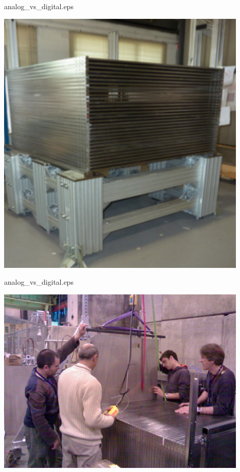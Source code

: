 \documentclass[10pt]{beamer}
\begin{document}
\begin{frame}{analog\_vs\_digital.eps}
    \centerline{\includegraphics[width=0.9\textwidth]{images/ConstructionStructure}}
\end{frame}
\begin{frame}{analog\_vs\_digital.eps}
    \centerline{\includegraphics[width=0.9\textwidth]{images/ConstructionInsertion}}
\end{frame}
\end{document}
